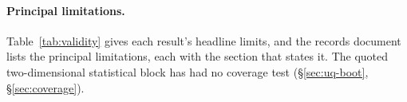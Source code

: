 \paragraph{Principal limitations.} Table~\ref{tab:validity} gives each result's headline limits, and the records document lists the principal limitations, each with the section that states it. The quoted two-dimensional statistical block has had no coverage test (\S\ref{sec:uq-boot}, \S\ref{sec:coverage}).


